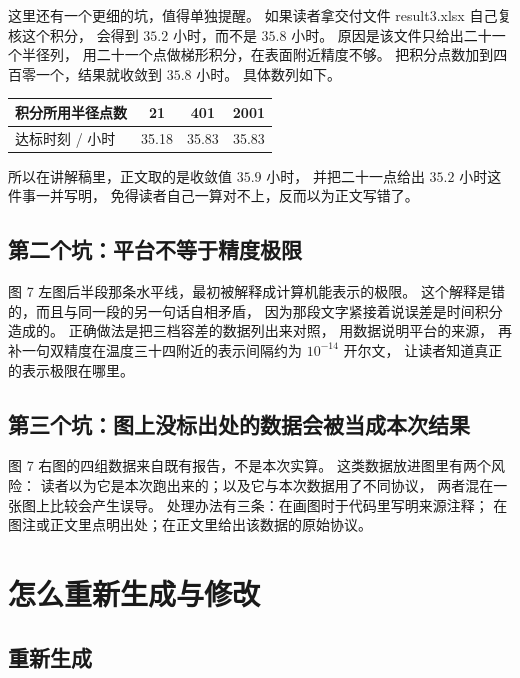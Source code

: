\documentclass[11pt,a4paper]{article}
\begin{document}
这里还有一个更细的坑，值得单独提醒。
如果读者拿交付文件 result3.xlsx 自己复核这个积分，
会得到 $35.2$ 小时，而不是 $35.8$ 小时。
原因是该文件只给出二十一个半径列，
用二十一个点做梯形积分，在表面附近精度不够。
把积分点数加到四百零一个，结果就收敛到 $35.8$ 小时。
具体数列如下。

\begin{center}
\begin{tabular}{@{}lccc@{}}
\toprule
积分所用半径点数 & 21 & 401 & 2001 \\
\midrule
达标时刻 / 小时 & 35.18 & 35.83 & 35.83 \\
\bottomrule
\end{tabular}
\end{center}

所以在讲解稿里，正文取的是收敛值 $35.9$ 小时，
并把二十一点给出 $35.2$ 小时这件事一并写明，
免得读者自己一算对不上，反而以为正文写错了。

\subsection{第二个坑：平台不等于精度极限}

图 7 左图后半段那条水平线，最初被解释成计算机能表示的极限。
这个解释是错的，而且与同一段的另一句话自相矛盾，
因为那段文字紧接着说误差是时间积分造成的。
正确做法是把三档容差的数据列出来对照，
用数据说明平台的来源，
再补一句双精度在温度三十四附近的表示间隔约为 $10^{-14}$ 开尔文，
让读者知道真正的表示极限在哪里。

\subsection{第三个坑：图上没标出处的数据会被当成本次结果}

图 7 右图的四组数据来自既有报告，不是本次实算。
这类数据放进图里有两个风险：
读者以为它是本次跑出来的；以及它与本次数据用了不同协议，
两者混在一张图上比较会产生误导。
处理办法有三条：在画图时于代码里写明来源注释；
在图注或正文里点明出处；在正文里给出该数据的原始协议。

\section{怎么重新生成与修改}

\subsection{重新生成}
\end{document}
